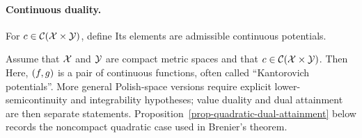 \paragraph{Continuous duality.}
\begin{defn}\label{def-continuous-admissible-potentials}
For $c\in\mathcal{C}(\mathcal{X}\times\mathcal{Y})$, define
Its elements are admissible continuous potentials.
\end{defn}
\begin{prop}\label{prop-kantorovich-duality-general}
Assume that $\mathcal{X}$ and $\mathcal{Y}$ are compact metric spaces and that $c\in\mathcal{C}(\mathcal{X}\times\mathcal{Y})$. Then
Here, $(f,g)$ is a pair of continuous functions, often called ``Kantorovich potentials''.
More general Polish-space versions require explicit lower-semicontinuity and integrability hypotheses; value duality and dual attainment are then separate statements. Proposition~\ref{prop-quadratic-dual-attainment} below records the noncompact quadratic case used in Brenier's theorem.
\end{prop}
